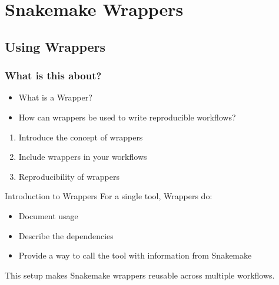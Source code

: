 \section{Snakemake Wrappers}
{   
}

\subsection{Using Wrappers}

\begin{frame}
    \frametitle{What is this about?}
    \begin{question}[Questions]
        \begin{itemize}
            \item What is a \Snakemake{} Wrapper?
            \item How can \Snakemake{} wrappers be used to write reproducible workflows?
        \end{itemize}
    \end{question}
    \begin{docs}[Objectives]
        \begin{enumerate}
            \item Introduce the concept of \Snakemake{} wrappers
            \item Include \Snakemake{} wrappers in your workflows
            \item Reproducibility of \Snakemake{} wrappers
        \end{enumerate}
    \end{docs}
\end{frame}

\begin{frame}{Introduction to Wrappers}
    For a single tool, \Snakemake{} Wrappers do:
    \begin{itemize}[<+->]
        \item Document usage
        \item Describe the dependencies
        \item Provide a way to call the tool with information from Snakemake
    \end{itemize}
    This setup makes Snakemake wrappers reusable across multiple workflows.
\end{frame}

